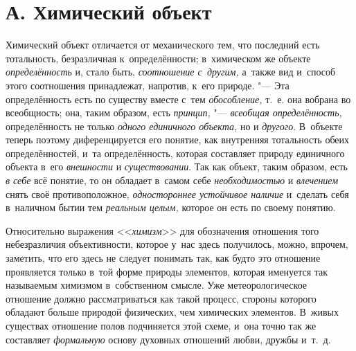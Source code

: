 \section[А. Химический объект]{А. Химический объект}

Химический объект отличается от механического тем, что
последний есть тотальность, безразличная к~определённости; в~химическом же
объекте {\em определённость}
и, стало быть,
{\em соотношение с~другим,}
а~также вид и~способ этого соотношения принадлежат, напротив,
к~его природе. "--- Эта определённость есть по существу вместе
с~тем {\em обособление,}
т.~е. она вобрана во всеобщность; она, таким образом, есть
{\em принцип,} "---
{\em всеобщая определённость,}
определённость не только
{\em одного единичного объекта,}
но и {\em другого}.
В~объекте теперь поэтому диференцируется его понятие, как
внутренняя тотальность обеих определённостей, и~та определённость, которая
составляет природу единичного объекта в~его
{\em внешности} и
{\em существовании}. Так
как объект, таким образом, есть {\em в
себе} всё понятие, то он обладает в~самом себе
{\em необходимостью} и
{\em влечением} снять
своё противоположное, {\em одностороннее
устойчивое наличие} и~сделать себя в~наличном бытии тем
{\em реальным целым,}
которое он есть по своему понятию.

Относительно выражения
<<{\em химизм}>> для
обозначения отношения того небезразличия объективности, которое у~нас здесь
получилось, можно, впрочем, заметить, что его здесь не следует понимать
так, как будто это отношение проявляется только в~той форме природы
элементов, которая именуется так называемым химизмом в~собственном смысле.
Уже метеорологическое отношение должно рассматриваться как такой процесс,
стороны которого обладают больше природой физических, чем химических
элементов. В~живых существах отношение полов подчиняется этой схеме, и~она
точно так же составляет
{\em формальную} основу
духовных отношений любви, дружбы
и~т.~д.

